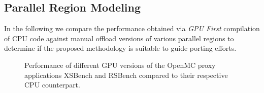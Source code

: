 



\subsection{Parallel Region Modeling}

In the following we compare the performance obtained via \emph{GPU First} compilation of CPU code against manual offload versions of various parallel regions to determine if the proposed methodology is suitable to guide porting efforts.

\begin{figure*}[htb]

\begin{minipage}[t]{.45\linewidth}\centering%
    
    \label{fig:xbench}%
\end{minipage}%
\hfill%
\begin{minipage}[t]{.45\linewidth}\centering%
    
    \label{fig:rsbench}%
\end{minipage}
    \vspace*{-3mm}

\caption{Performance of different GPU versions of the OpenMC proxy applications XSBench and RSBench compared to their respective CPU counterpart.}
\vspace*{-3mm}
\label{fig:xsrsbench}
    
\end{figure*}

